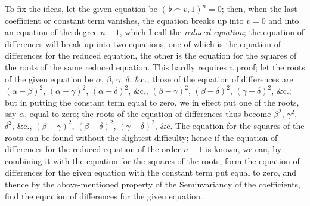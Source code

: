 \documentclass[11pt,a4paper]{book}
\begin{document}
To fix the ideas, let the given equation be $(\,\flat\,\frown\, v,1)^n=0$; then, when the last coefficient or constant term vanishes, the equation breaks up into $v=0$ and into an equation of the degree $n-1$, which I call the \textit{reduced equation}; the equation of differences will break up into two equations, one of which is the equation of differences for the reduced equation, the other is the equation for the squares of the roots of the same reduced equation. This hardly requires a proof; let the roots of the given equation be $\alpha$, $\beta$, $\gamma$, $\delta$, \&c., those of the equation of differences are $(\alpha-\beta)^2$, $(\alpha-\gamma)^2$, $(\alpha-\delta)^2$, \&c., $(\beta-\gamma)^2$, $(\beta-\delta)^2$, $(\gamma-\delta)^2$, \&c.; but in putting the constant term equal to zero, we in effect put one of the roots, say $\alpha$, equal to zero; the roots of the equation of differences thus become $\beta^2$, $\gamma^2$, $\delta^2$, \&c., $(\beta-\gamma)^2$, $(\beta-\delta)^2$, $(\gamma-\delta)^2$, \&c. The equation for the squares of the roots can be found without the slightest difficulty; hence if the equation of differences for the reduced equation of the order $n-1$ is known, we can, by combining it with the equation for the squares of the roots, form the equation of differences for the given equation with the constant term put equal to zero, and thence by the above-mentioned property of the Seminvariancy of the coefficients, find the equation of differences for the given equation.
\end{document}
